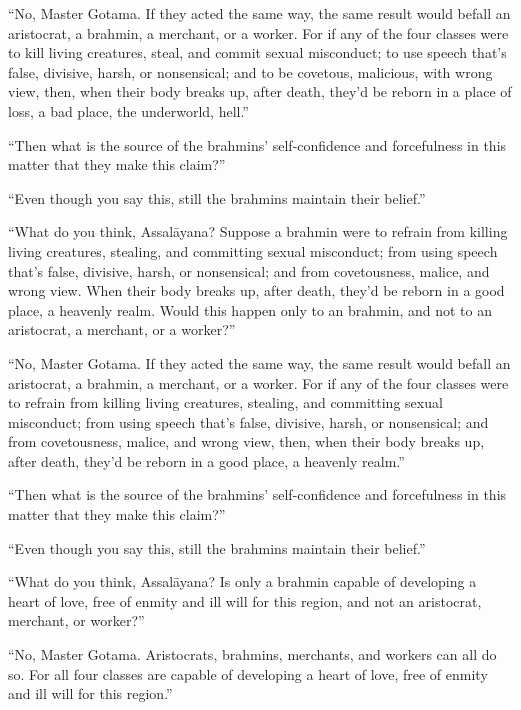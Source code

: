 \documentclass[12pt,openany]{book}%
\begin{document}
“No, Master Gotama. If they acted the same way, the same result would befall an aristocrat, a brahmin, a merchant, or a worker. For if any of the four classes were to kill living creatures, steal, and commit sexual misconduct; to use speech that’s false, divisive, harsh, or nonsensical; and to be covetous, malicious, with wrong view, then, when their body breaks up, after death, they’d be reborn in a place of loss, a bad place, the underworld, hell.” 

“Then what is the source of the brahmins’ self-confidence and forcefulness in this matter that they make this claim?” 

“Even though you say this, still the brahmins maintain their belief.” 

“What do you think, \textsanskrit{Assalāyana}? Suppose a brahmin were to refrain from killing living creatures, stealing, and committing sexual misconduct; from using speech that’s false, divisive, harsh, or nonsensical; and from covetousness, malice, and wrong view. When their body breaks up, after death, they’d be reborn in a good place, a heavenly realm. Would this happen only to an brahmin, and not to an aristocrat, a merchant, or a worker?” 

“No, Master Gotama. If they acted the same way, the same result would befall an aristocrat, a brahmin, a merchant, or a worker. For if any of the four classes were to refrain from killing living creatures, stealing, and committing sexual misconduct; from using speech that’s false, divisive, harsh, or nonsensical; and from covetousness, malice, and wrong view, then, when their body breaks up, after death, they’d be reborn in a good place, a heavenly realm.” 

“Then what is the source of the brahmins’ self-confidence and forcefulness in this matter that they make this claim?” 

“Even though you say this, still the brahmins maintain their belief.” 

“What do you think, \textsanskrit{Assalāyana}? Is only a brahmin capable of developing a heart of love, free of enmity and ill will for this region, and not an aristocrat, merchant, or worker?” 

“No, Master Gotama. Aristocrats, brahmins, merchants, and workers can all do so. For all four classes are capable of developing a heart of love, free of enmity and ill will for this region.” 
\end{document}
